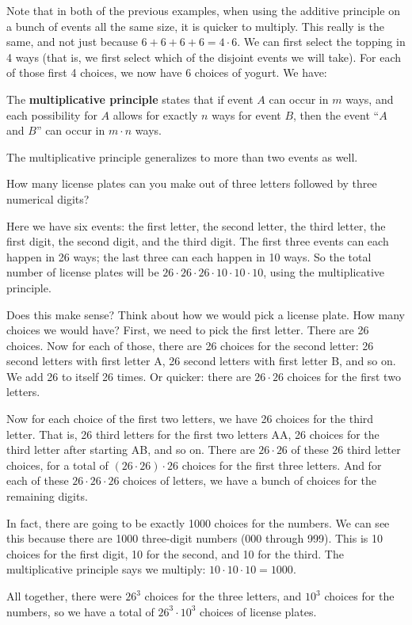 \documentclass[11pt,]{book}
\newcommand{\terminology}[1]{\textbf{#1}}
\theoremstyle{ptxplainnotitle}
\theoremstyle{ptxplaintitle}
\theoremstyle{ptxdefinitionnotitle}
\theoremstyle{ptxdefinitiontitle}
\theoremstyle{ptxdefinitionnotitle}
\theoremstyle{ptxdefinitiontitle}
\theoremstyle{ptxdefinitionnotitle}
\theoremstyle{ptxdefinitiontitle}
\theoremstyle{ptxdefinitiontitlenonumber}
\theoremstyle{ptxdefinitiontitlenonumber}
\numberwithin{equation}{chapter}
\begin{document}
\hypertarget{p-998}{}%
Note that in both of the previous examples, when using the additive principle on a bunch of events all the same size, it is quicker to multiply. This really is the same, and not just because \(6 + 6 + 6 + 6 = 4\cdot 6\). We can first select the topping in 4 ways (that is, we first select which of the disjoint events we will take). For each of those first 4 choices, we now have 6 choices of yogurt. We have:%
\begin{assemblage}\label{assemblage-12}
\hypertarget{p-999}{}%
The \terminology{multiplicative principle} states that if event \(A\) can occur in \(m\) ways, and each possibility for \(A\) allows for exactly \(n\) ways for event \(B\), then the event ``\(A\) and \(B\)'' can occur in \(m \cdot n\) ways.%
\end{assemblage}
\hypertarget{p-1000}{}%
The multiplicative principle generalizes to more than two events as well.%
\begin{example}\label{example-37}
\hypertarget{p-1001}{}%
How many license plates can you make out of three letters followed by three numerical digits?%
\par\smallskip%
\noindent\textbf{}\hypertarget{solution-139}{}\hypertarget{p-1002}{}%
Here we have six events: the first letter, the second letter, the third letter, the first digit, the second digit, and the third digit. The first three events can each happen in 26 ways; the last three can each happen in 10 ways. So the total number of license plates will be \(26\cdot 26\cdot 26 \cdot 10 \cdot 10 \cdot 10\), using the multiplicative principle.%
\par
\hypertarget{p-1003}{}%
Does this make sense? Think about how we would pick a license plate. How many choices we would have? First, we need to pick the first letter. There are 26 choices. Now for each of those, there are 26 choices for the second letter: 26 second letters with first letter A, 26 second letters with first letter B, and so on. We add 26 to itself 26 times. Or quicker: there are \(26 \cdot 26\) choices for the first two letters.%
\par
\hypertarget{p-1004}{}%
Now for each choice of the first two letters, we have 26 choices for the third letter. That is, 26 third letters for the first two letters AA, 26 choices for the third letter after starting AB, and so on. There are \(26 \cdot 26\) of these \(26\) third letter choices, for a total of \((26\cdot26)\cdot 26\) choices for the first three letters. And for each of these \(26\cdot26\cdot26\) choices of letters, we have a bunch of choices for the remaining digits.%
\par
\hypertarget{p-1005}{}%
In fact, there are going to be exactly 1000 choices for the numbers. We can see this because there are 1000 three-digit numbers (000 through 999). This is 10 choices for the first digit, 10 for the second, and 10 for the third. The multiplicative principle says we multiply: \(10\cdot 10 \cdot 10 = 1000\).%
\par
\hypertarget{p-1006}{}%
All together, there were \(26^3\) choices for the three letters, and \(10^3\) choices for the numbers, so we have a total of \(26^3 \cdot 10^3\) choices of license plates.%
\end{example}
\end{document}
